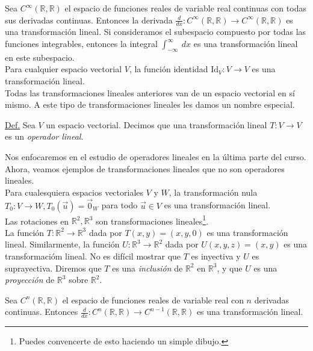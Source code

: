 \documentclass[notasLineal]{subfiles}
\begin{document}
Sea $C^{\infty}(\mathbb{R},\mathbb{R})$ el espacio de funciones reales de variable real continuas con todas sus derivadas continuas. Entonces la derivada $\frac{d}{dx}:C^{\infty}(\mathbb{R},\mathbb{R})\to C^{\infty}(\mathbb{R},\mathbb{R})$ es una transformación lineal. Si consideramos el subespacio compuesto por todas las funciones integrables, entonces la integral $\int_{-\infty}^{\infty} \ dx$ es una transformación lineal en este subespacio. \\

Para cualquier espacio vectorial $V$, la función identidad $\text{Id}_{V}:V\to V$ es una transformación lineal. \\

Todas las transformaciones lineales anteriores van de un espacio vectorial en sí mismo. A este tipo de transformaciones lineales les damos un nombre especial.

\begin{tcolorbox}
\underline{Def.} Sea $V$ un espacio vectorial. Decimos que una transformación lineal $T:V\to V$ es un \emph{operador lineal}.
\end{tcolorbox}

\noindent Nos enfocaremos en el estudio de operadores lineales en la última parte del curso. Ahora, veamos ejemplos de transformaciones lineales que no son operadores lineales. \\

Para cualesquiera espacios vectoriales $V$ y $W$, la transformación nula $T_0:V\to W, T_0(\vec{u})=\vec{0}_W$ para todo $\vec{u}\in V$ es una transformación lineal. \\

Las rotaciones en $\mathbb{R}^2, \mathbb{R}^3$ son transformaciones lineales\footnote{Puedes convencerte de esto haciendo un simple dibujo.}. \\

La función $T:\mathbb{R}^2\to \mathbb{R}^3$ dada por $T(x,y) = (x,y,0)$ es una transformación lineal. Similarmente, la función $U:\mathbb{R}^3\to\mathbb{R}^2$ dada por $U(x,y,z) = (x,y)$ es una transformacióm lineal. No es difícil mostrar que $T$ es inyectiva y $U$ es suprayectiva. Diremos que $T$ es una \emph{inclusión} de $\mathbb{R}^2$ en $\mathbb{R}^3$, y que $U$ es una \emph{proyección} de $\mathbb{R}^3$ sobre $\mathbb{R}^2$.

Sea $C^n(\mathbb{R},\mathbb{R})$ el espacio de funciones reales de variable real con $n$ derivadas continuas. Entonces $\frac{d}{dx}:C^n(\mathbb{R},\mathbb{R})\to C^{n-1}(\mathbb{R},\mathbb{R})$ es una transformación lineal.
\end{document}

